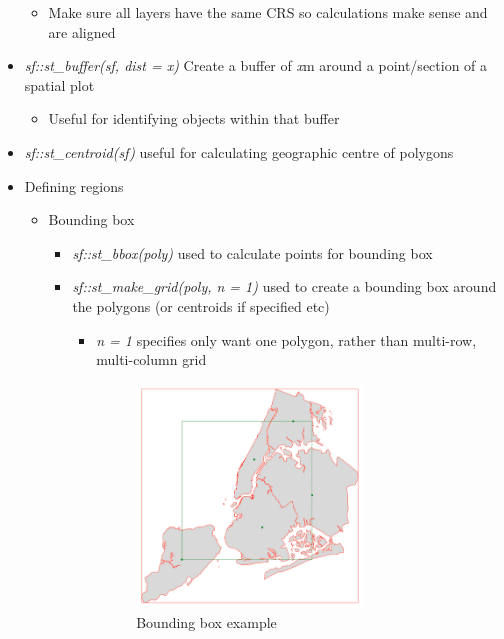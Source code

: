 \documentclass{article}
\begin{document}
\begin{itemize}
    \begin{itemize}
        \item Make sure all layers have the same CRS so calculations make sense and are aligned
    \end{itemize}
    \item \textit{sf::st\_buffer(sf, dist = x)} Create a buffer of \textit{x}m around a point/section of a spatial plot
    \begin{itemize}
        \item Useful for identifying objects within that buffer
    \end{itemize}
    \item \textit{sf::st\_centroid(sf)} useful for calculating geographic centre of polygons
    \item Defining regions
    \begin{itemize}
        \item Bounding box
        \begin{itemize}
            \item \textit{sf::st\_bbox(poly)} used to calculate points for bounding box
            \item \textit{sf::st\_make\_grid(poly, n = 1)} used to create a bounding box around the polygons (or centroids if specified etc)
            \begin{itemize}
                \item \textit{n = 1} specifies only want one polygon, rather than multi-row, multi-column grid
                
                \begin{figure}[h]
                    \centering
                    \caption{Bounding box example}
                    \label{bounding box}
                    \includegraphics[width=6cm]{bounding-box.png}
                \end{figure} 


\end{itemize}
\end{itemize}
\end{itemize}
\end{itemize}
\end{document}
